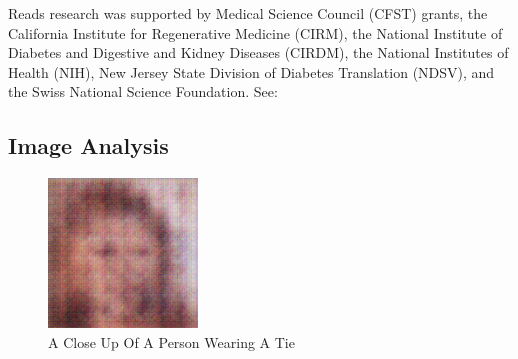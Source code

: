 \documentclass{article}%
\begin{document}
Reads research was supported by Medical Science Council (CFST) grants, the California Institute for Regenerative Medicine (CIRM), the National Institute of Diabetes and Digestive and Kidney Diseases (CIRDM), the National Institutes of Health (NIH), New Jersey State Division of Diabetes Translation (NDSV), and the Swiss National Science Foundation. See:

%
\subsection{Image Analysis}%
\label{subsec:ImageAnalysis}%


\begin{figure}[h!]%
\centering%
\includegraphics[width=150px]{500_fake_images/samples_5_352.png}%
\caption{A Close Up Of A Person Wearing A Tie}%
\end{figure}

%
\end{document}
